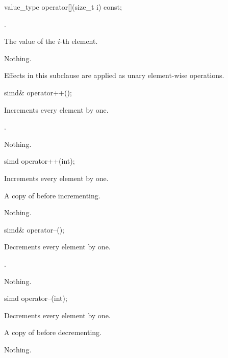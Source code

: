 \begin{itemdecl}
value_type operator[](size_t i) const;
\end{itemdecl}
\begin{itemdescr}
  \pnum\requires {}.

  \pnum\returns The value of the $i$-th element.

  \pnum\throws Nothing.
\end{itemdescr}

\pnum Effects in this subclause are applied as unary element-wise operations.

\begin{itemdecl}
simd& operator++();
\end{itemdecl}
\begin{itemdescr}
  \pnum\effects Increments every element by one.

  \pnum\returns {}.

  \pnum\throws Nothing.
\end{itemdescr}

\begin{itemdecl}
simd operator++(int);
\end{itemdecl}
\begin{itemdescr}
  \pnum\effects Increments every element by one.

  \pnum\returns A copy of  before incrementing.

  \pnum\throws Nothing.
\end{itemdescr}

\begin{itemdecl}
simd& operator--();
\end{itemdecl}
\begin{itemdescr}
  \pnum\effects Decrements every element by one.

  \pnum\returns {}.

  \pnum\throws Nothing.
\end{itemdescr}

\begin{itemdecl}
simd operator--(int);
\end{itemdecl}
\begin{itemdescr}
  \pnum\effects Decrements every element by one.

  \pnum\returns A copy of  before decrementing.

  \pnum\throws Nothing.
\end{itemdescr}

